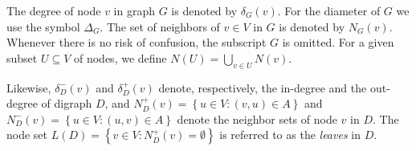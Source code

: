 



The degree of node $v$ in graph $G$ is denoted by $\delta_G(v)$.
For the diameter of $G$ we use the symbol $\Delta_G$.
The set of neighbors of $v\in V$ in $G$ is denoted by $N_G(v)$.
Whenever there is no risk of confusion, the subscript $G$ is omitted.
For a given subset $U\subseteq V$ of nodes, we define $N(U)=\bigcup_{v\in U}N(v)$.

Likewise, $\delta^-_D(v)$ and $\delta^+_D(v)$ denote, respectively, the in-degree and the out-degree of digraph $D$,
and $N_D^+(v)=\left\{u\in V:(v,u)\in A\right\}$ and $N_D^-(v)=\left\{u\in V:(u,v)\in A\right\}$ denote the neighbor sets of node $v$ in $D$.
The node set $L(D)=\left\{v\in V: N_D^+(v)=\emptyset\right\}$ is referred to as the \emph{leaves} in $D$.

